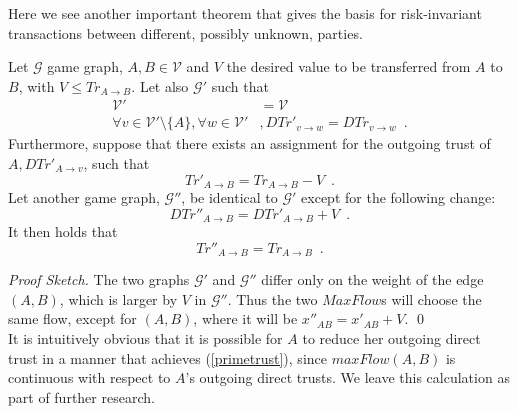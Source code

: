 \documentclass[11pt]{llncs}
\theoremstyle{definition}
\newenvironment{proofsketch}{\textit{Proof Sketch.}}{\qed \bigskip \ \\}
\begin{document}
     Here we see another important theorem that gives the basis for risk-invariant transactions between different, possibly
     unknown, parties.
     \begin{theorem}
     \label{riskinv}
        Let $\mathcal{G}$ game graph, $A, B \in \mathcal{V}$ and $V$ the desired value to be transferred from $A$ to $B$,
        with $V \leq Tr_{A \rightarrow B}$. Let also $\mathcal{G}'$ such that
        \begin{align}
           \mathcal{V}' &= \mathcal{V} \\
           \forall v \in \mathcal{V}' \setminus \{A\}, \forall w \in \mathcal{V}'&, DTr'_{v \rightarrow w} =
           DTr_{v \rightarrow w} \enspace.
        \end{align}
        Furthermore, suppose that there exists an assignment for the outgoing trust of $A, DTr'_{A \rightarrow v}$, such that
        \begin{equation}
        \label{primetrust}
           Tr'_{A \rightarrow B} = Tr_{A \rightarrow B} - V \enspace.
        \end{equation}
        Let another game graph, $\mathcal{G}''$, be identical to $\mathcal{G}'$ except for the following change:
        \begin{equation}
           DTr''_{A \rightarrow B} = DTr'_{A \rightarrow B} + V \enspace.
        \end{equation}
        It then holds that
        \begin{equation}
           Tr''_{A \rightarrow B} = Tr_{A \rightarrow B} \enspace.
        \end{equation}
     \end{theorem}
     \begin{proofsketch}
        The two graphs $\mathcal{G}'$ and $\mathcal{G}''$ differ only on the weight of the edge $\left(A, B\right)$, which is
        larger by $V$ in $\mathcal{G}''$. Thus the two $MaxFlow$s will choose the same flow, except for $\left(A, B\right)$,
        where it will be $x''_{AB} = x'_{AB} + V$.
     \end{proofsketch}
     It is intuitively obvious that it is possible for $A$ to reduce her outgoing direct trust in a manner that achieves
     (\ref{primetrust}), since $maxFlow\left(A, B\right)$ is continuous with respect to $A$'s outgoing direct trusts. We
     leave this calculation as part of further research.
\end{document}
